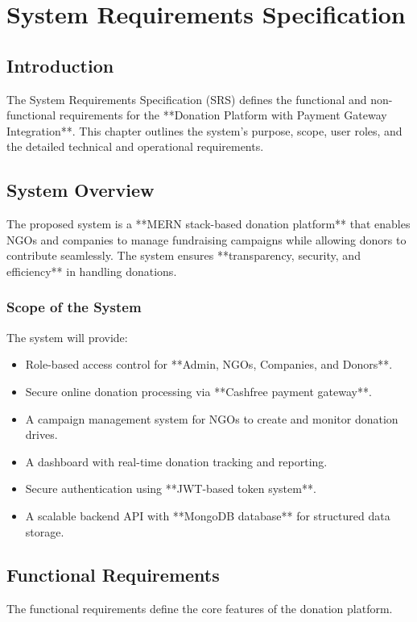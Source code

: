 \chapter{System Requirements Specification}

\section{Introduction}
The System Requirements Specification (SRS) defines the functional and non-functional requirements for the **Donation Platform with Payment Gateway Integration**. This chapter outlines the system’s purpose, scope, user roles, and the detailed technical and operational requirements.

\section{System Overview}
The proposed system is a **MERN stack-based donation platform** that enables NGOs and companies to manage fundraising campaigns while allowing donors to contribute seamlessly. The system ensures **transparency, security, and efficiency** in handling donations.

\subsection{Scope of the System}
The system will provide:
\begin{itemize}
    \item Role-based access control for **Admin, NGOs, Companies, and Donors**.
    \item Secure online donation processing via **Cashfree payment gateway**.
    \item A campaign management system for NGOs to create and monitor donation drives.
    \item A dashboard with real-time donation tracking and reporting.
    \item Secure authentication using **JWT-based token system**.
    \item A scalable backend API with **MongoDB database** for structured data storage.
\end{itemize}

\section{Functional Requirements}
The functional requirements define the core features of the donation platform.

